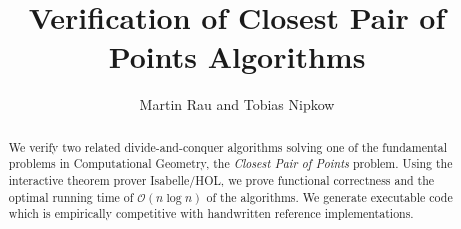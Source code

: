 \documentclass{llncs}
\begin{document}
\title{Verification of Closest Pair of Points Algorithms}
\author{Martin Rau and Tobias Nipkow}
\date{}
\maketitle

\begin{abstract}
We verify two related divide-and-conquer algorithms solving one of the fundamental problems
in Computational Geometry, the \textit{Closest Pair of Points} problem.
Using the interactive theorem prover Isabelle/HOL, we prove functional correctness
and the optimal running time of $\mathcal{O}(n \log n)$ of the algorithms. 
We generate executable code which is empirically competitive with handwritten
reference implementations.
\end{abstract}





\end{document}

